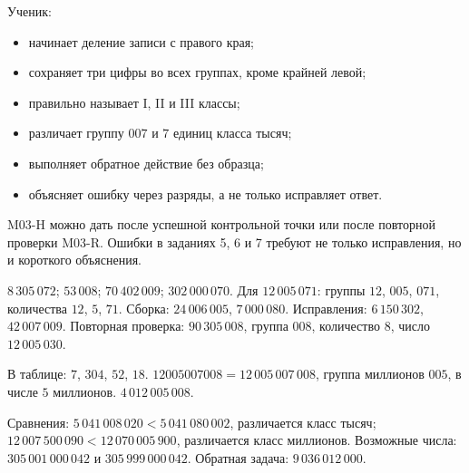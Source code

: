 \begin{teacherbox}
  Ученик:
  \begin{itemize}
    \item начинает деление записи с правого края;
    \item сохраняет три цифры во всех группах, кроме крайней левой;
    \item правильно называет I, II и III классы;
    \item различает группу \(007\) и \(7\) единиц класса тысяч;
    \item выполняет обратное действие без образца;
    \item объясняет ошибку через разряды, а не только исправляет ответ.
  \end{itemize}
\end{teacherbox}

\begin{notebox}
  M03-H можно дать после успешной контрольной точки или после повторной
  проверки M03-R. Ошибки в заданиях 5, 6 и 7 требуют не только исправления, но и
  короткого объяснения.
\end{notebox}

\begin{teacherbox}[Ответы M03-R]
  \(8\,305\,072\); \(53\,008\); \(70\,402\,009\); \(302\,000\,070\).
  Для \(12\,005\,071\): группы \(12\), \(005\), \(071\), количества \(12\),
  \(5\), \(71\). Сборка: \(24\,006\,005\), \(7\,000\,080\). Исправления:
  \(6\,150\,302\), \(42\,007\,009\). Повторная проверка:
  \(90\,305\,008\), группа \(008\), количество \(8\), число \(12\,005\,030\).
\end{teacherbox}

\begin{teacherbox}
  В таблице: \(7\), \(304\), \(52\), \(18\).
  \(12005007008=12\,005\,007\,008\), группа миллионов \(005\), в числе
  \(5\) миллионов. \(4\,012\,005\,008\).

  Сравнения: \(5\,041\,008\,020<5\,041\,080\,002\), различается класс тысяч;
  \(12\,007\,500\,090<12\,070\,005\,900\), различается класс миллионов.
  Возможные числа: \(305\,001\,000\,042\) и \(305\,999\,000\,042\).
  Обратная задача: \(9\,036\,012\,000\).
\end{teacherbox}
